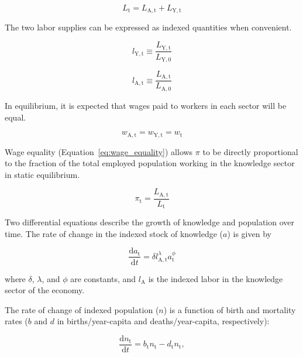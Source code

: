 \documentclass[letterpaper,12pt]{article}
\begin{document}
\begin{equation} \label{eq:labor_supply}
	L_\mathrm{t} = L_\mathrm{A,t} + L_\mathrm{Y,t}
\end{equation}

The two labor supplies can be expressed as indexed quantities when convenient.

\begin{equation}
	l_\mathrm{Y,t} \equiv \frac{L_\mathrm{Y,t}}{L_\mathrm{Y,0}}
\end{equation}

\begin{equation}
	l_\mathrm{A,t} \equiv \frac{L_\mathrm{A,t}}{L_\mathrm{A,0}}
\end{equation}

In equilibrium, it is expected that wages paid to workers in each sector will be equal.

\begin{equation} \label{eq:wage_equality}
	w_\mathrm{A,t} = w_\mathrm{Y,t} = w_\mathrm{t}
\end{equation}

Wage equality (Equation~\ref{eq:wage_equality}) allows $\pi$ to be directly proportional to the fraction of the total employed population working in the knowledge sector in static equilibrium.

\begin{equation} \label{eq:pi}
	\pi_\mathrm{t} = \frac{L_\mathrm{A,t}}{L_\mathrm{t}}
\end{equation}

Two differential equations describe the growth of knowledge and population over time. The rate of change in the indexed stock of knowledge ($a$) is given by

\begin{equation} \label{eq:da_dt}
	\frac{\mathrm{d}a_\mathrm{t}}{\mathrm{d}t} = \delta l_\mathrm{A,t}^\lambda a_\mathrm{t}^\phi
\end{equation}

\noindent where $\delta$, $\lambda$, and $\phi$ are constants, and $l_\mathrm{A}$ is the indexed labor in the knowledge sector of the economy.

The rate of change of indexed population ($n$) is a function of birth and mortality rates ($b$ and $d$ in births/year-capita and deaths/year-capita, respectively):

\begin{equation} \label{eq:dn_dt}
	\frac{\mathrm{d}n_\mathrm{t}}{\mathrm{d}t} = b_\mathrm{t} n_\mathrm{t} - d_\mathrm{t} n_\mathrm{t},
\end{equation}
\end{document}
